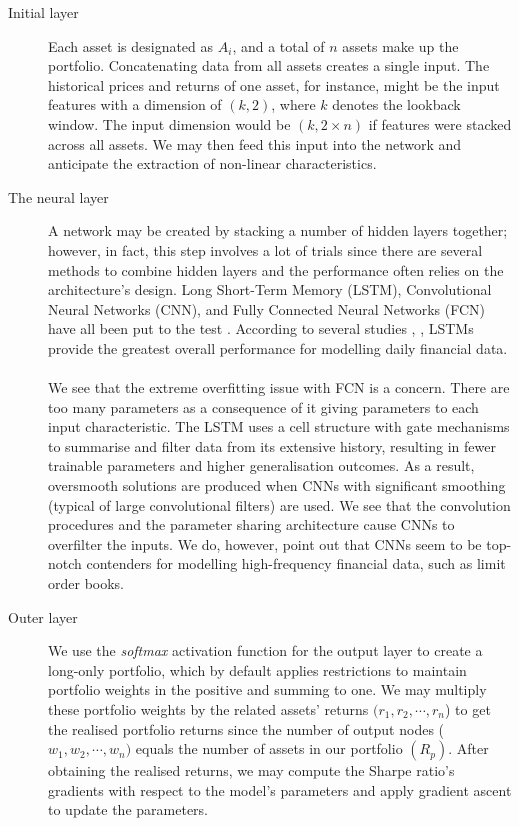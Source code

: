 \begin{description}
\item [Initial layer]  Each asset is designated as $A_{i}$, and a total of $n$ assets make up the portfolio. Concatenating data from all assets creates a single input. The historical prices and returns of one asset, for instance, might be the input features with a dimension of $(k, 2)$, where $k$ denotes the lookback window.
The input dimension would be $(k, 2\times n)$ if features were stacked across all assets. We may then feed this input into the network and anticipate the extraction of non-linear characteristics.
\item [The neural layer] A network may be created by stacking a number of hidden layers together; however, in fact, this step involves a lot of trials since there are several methods to combine hidden layers and the performance often relies on the architecture's design. Long Short-Term Memory (LSTM), Convolutional Neural Networks (CNN), and Fully Connected Neural Networks (FCN) have all been put to the test \cite{Hochreiter1997}. According to several studies \cite{Tsantekidis2017}, \cite{Lim2020} , LSTMs provide the greatest overall performance for modelling daily financial data.\\\\
We see that the extreme overfitting issue with FCN is a concern. There are too many parameters as a consequence of it giving parameters to each input characteristic. The LSTM uses a cell structure with gate mechanisms to summarise and filter data from its extensive history, resulting in fewer trainable parameters and higher generalisation outcomes. As a result, oversmooth solutions are produced when CNNs with significant smoothing (typical of large convolutional filters) are used. We see that the convolution procedures and the parameter sharing architecture cause CNNs to overfilter the inputs. We do, however, point out that CNNs seem to be top-notch contenders for modelling high-frequency financial data, such as limit order books.
\item [Outer layer] We use the \emph{softmax} activation function for the output layer to create a long-only portfolio, which by default applies restrictions to maintain portfolio weights in the positive and summing to one. We may multiply these portfolio weights by the related assets' returns $(r_{1}, r_{2},\cdots, r_{n}$) to get the realised portfolio returns since the number of output nodes ($w_{1}, w_{2},\cdots, w_{n})$ equals the number of assets in our portfolio $(R_{p} )$. After obtaining the realised returns, we may compute the Sharpe ratio's gradients with respect to the model's parameters and apply gradient ascent to update the parameters.
\end{description}